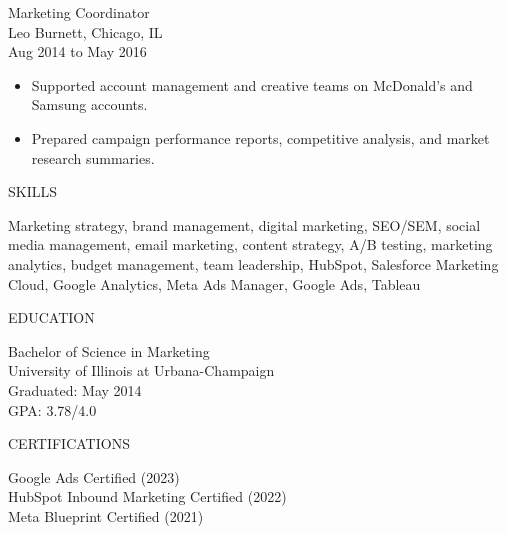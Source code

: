 \documentclass[11pt,a4paper]{article}
\begin{document}
\vspace{4pt}

Marketing Coordinator\\
Leo Burnett, Chicago, IL\\
Aug 2014 to May 2016
\begin{itemize}
  \item Supported account management and creative teams on McDonald's and Samsung accounts.
  \item Prepared campaign performance reports, competitive analysis, and market research summaries.
\end{itemize}

\vspace{8pt}

SKILLS

Marketing strategy, brand management, digital marketing, SEO/SEM, social media management, email marketing, content strategy, A/B testing, marketing analytics, budget management, team leadership, HubSpot, Salesforce Marketing Cloud, Google Analytics, Meta Ads Manager, Google Ads, Tableau

\vspace{8pt}

EDUCATION

Bachelor of Science in Marketing\\
University of Illinois at Urbana-Champaign\\
Graduated: May 2014\\
GPA: 3.78/4.0

\vspace{8pt}

CERTIFICATIONS

Google Ads Certified (2023)\\
HubSpot Inbound Marketing Certified (2022)\\
Meta Blueprint Certified (2021)
\end{document}
